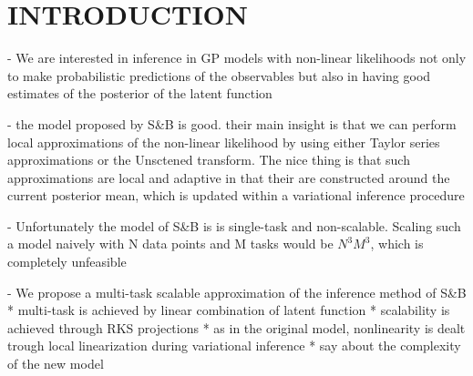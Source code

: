 \section{INTRODUCTION}
% 
- We are interested in inference in GP models with non-linear likelihoods
not only to make probabilistic predictions of the observables but also in having
good estimates of the posterior of the latent function

- the model proposed by S\&B  is good. their main insight is that we can perform 
local approximations of the non-linear likelihood by using either Taylor series 
approximations  or the Unsctened transform. The nice thing is that such approximations
are local and adaptive in that their are constructed around the current posterior 
mean, which is updated within a variational inference procedure 

- Unfortunately the model of S\&B is  is single-task and non-scalable. 
Scaling such a model naively with N data points and M tasks would be $N^3M^3$,
which is completely unfeasible

- We propose a multi-task scalable approximation of  the inference method of S\&B 
* multi-task is achieved by linear combination of latent function
* scalability is achieved through RKS  projections 
* as in the original model, nonlinearity is dealt trough local linearization during 
variational inference
* say about the complexity of the new model 





